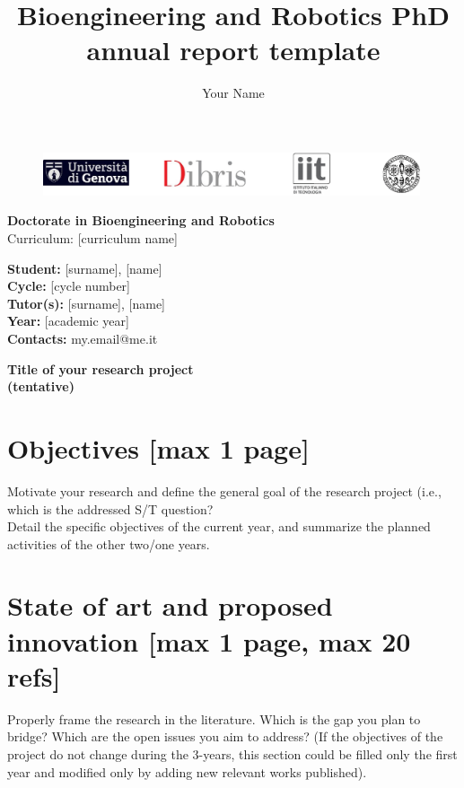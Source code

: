 \documentclass[11pt,a4paper]{article}
\author{Your Name}
\title{Bioengineering and Robotics PhD annual report template}
\begin{document}
\begin{figure}[t]
	\centering
	\includegraphics[width=0.99\textwidth]{logos/top_logos.pdf}
\end{figure}
\hphantom{h}\vspace{1.3cm}


\begin{center}
	
\LARGE{\textbf{Doctorate in Bioengineering and Robotics }\vspace{0.4cm}\\
Curriculum: [curriculum name]}

\end{center}

\begin{flushleft}
\vspace{1.5cm}
\large{\textbf{Student: }}\large{{[surname], [name]}}\vspace{0.2cm}\\
\large{\textbf{Cycle: }}\large{[cycle number]}\vspace{0.2cm}\\
\large{\textbf{Tutor(s): }}\large{{[surname], [name]}}\vspace{0.2cm}\\
\large{\textbf{Year: }}\large{[academic year]}\vspace{0.2cm}\\
\large{\textbf{Contacts: }}\large{{my.email@me.it}}
\end{flushleft}
\clearpage
\begin{center}
	\textbf{\normalsize{Title of your research project\\ (tentative)}}
\end{center}
\section{Objectives [max 1 page]}
Motivate your research and define the general goal of the research project (i.e., which is the addressed S/T question? \\
Detail the specific objectives of the current year, and summarize the planned activities of the other two/one years.  

\section{State of art and proposed innovation [max 1 page, max 20 refs]} 
Properly frame the research in the literature. Which is the gap you plan to bridge? Which are the open issues you aim to address? 
(If the objectives of the project do not change during the 3-years, this section could be filled only the first year and modified only by adding new relevant works published). 
\end{document}
